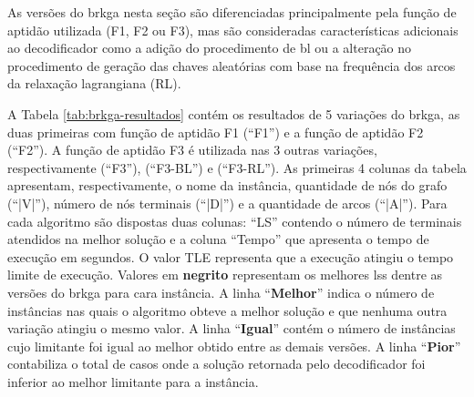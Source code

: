As  versões do  \gls{brkga} nesta  seção são  diferenciadas principalmente  pela
função de aptidão utilizada (F1, F2 ou F3), mas são consideradas características
adicionais  ao decodificador  como a  adição do  procedimento de  \gls{bl} ou  a
alteração  no  procedimento  de  geração  das  chaves  aleatórias  com  base  na
frequência dos arcos da relaxação lagrangiana (RL).

A  Tabela \ref{tab:brkga-resultados}  contém  os resultados  de  5 variações  do
\gls{brkga}, as duas primeiras  com função de aptidão F1 (``F1'')  e a função de
aptidão F2 (``F2''). A função de aptidão  F3 é utilizada nas 3 outras variações,
respectivamente (``F3''), (``F3-BL'')  e (``F3-RL''). As primeiras  4 colunas da
tabela apresentam,  respectivamente, o nome  da instância, quantidade de  nós do
grafo  (``|V|''), número  de nós  terminais (``|D|'')  e a  quantidade de  arcos
(``|A|''). Para  cada algoritmo  são dispostas duas  colunas: ``LS''  contendo o
número  de terminais  atendidos  na  melhor solução  e  a  coluna ``Tempo''  que
apresenta o tempo de execução em segundos. O valor TLE representa que a execução
atingiu o tempo  limite de execução. Valores em  \textbf{negrito} representam os
melhores \gls{ls}s dentre as versões do \gls{brkga} para cara instância. A linha
``\textbf{Melhor}'' indica o número de instâncias nas quais o algoritmo obteve a
melhor  solução e  que nenhuma  outra variação  atingiu o  mesmo valor.  A linha
``\textbf{Igual}'' contém  o número  de instâncias cujo  limitante foi  igual ao
melhor obtido entre  as demais versões. A linha  ``\textbf{Pior}'' contabiliza o
total  de casos  onde a  solução retornada  pelo decodificador  foi inferior  ao
melhor limitante para a instância.

\newpage

